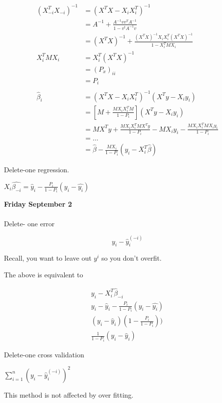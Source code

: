 \documentclass[11pt,fleqn]{book} %
\begin{document}
\begin{align*}
	(X^T_{-i} X_{-i})^{-1} &= (X^TX-X_iX_i^T)^{-1}\\
	&=A^{-1} + \frac{A^{-1}v v^T A^{-1}}{1 - v^t A^{-1} v}\\
	&=(X^T X)^{-1} + \frac{(X^TX)^{-1}X_i X_i^T (X^TX)^{-1}}{1 - X^T_i M X_i}\\
	X_i^T M X_i &= X_i^T (X^T X)^{-1}  \\
	&= (P_x)_{ii}\\
	&= P_i\\
	\\
	\hat{\beta}_i &= (X^TX - X_iX_i^T)^{-1} (X^T y - X_i y_i)\\
	&= [M + \frac{M X_i X_i^T M}{1 - P_i}] (X^T y - X_i y_i)\\
	&= M X^T y + \frac{M X_i X_i^T M X^T y}{1 - P_i} - M X_iy_i - \frac{M X_i X_i^T M X_i y_i}{1 - P_i}\\
	&= \dots\\
	&= \hat{\beta} - \frac{M X_i}{1 - P_i}(y_i - X_i^T \hat{\beta})
\end{align*}

Delete-one regression. 

$X_i\hat{\beta_{-i}} = \hat{y}_i - \frac{P_i}{1 - P_i} (y_i - \hat{y_i})$

\textbf{Friday September 2}\\
\\

Delete- one error

$$y_i - \hat{y}_i^{(-i)}$$

\begin{remark}
	Recall, you want to leave out $y^{i}$ so you don't overfit. 
\end{remark}


The above is equivalent to 

\begin{align*}
	y_i - X_i^T \hat{\beta}_{-i}\\
	y_i - \hat{y}_i - \frac{P_i}{1 - P_i} (y_i - \hat{y_i})\\
	(y_i - \hat{y}_i) (1 - \frac{P_i}{1 - P_i}))\\
	\frac{1}{1 - P_i} (y_i - \hat{y}_i)
\end{align*}


Delete-one cross validation 

$\displaystyle \sum^n_{i=1} (y_i - \hat{y}_i^{(-i)})^2$

This method is not affected by over fitting. 
\end{document}
